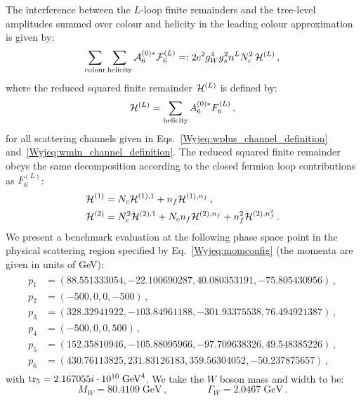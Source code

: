 \documentclass[main.tex]{subfiles}
\begin{document}
The interference between the $L$-loop finite remainders and the tree-level amplitudes summed over colour and helicity in the leading colour approximation is given by:
\begin{equation}
\sum_{\mathrm{colour}}\sum_{\mathrm{helicity}} \mathcal{A}_6^{(0)*} \mathcal{F}_6^{(L)} =: 2 e^2 g_W^4 g_s^2 n^L N_c^2 \, \mathcal{H}^{(L)} \,,
\end{equation}
where the reduced squared finite remainder $\mathcal{H}^{(L)}$ is defined by:
\begin{equation}
\mathcal{H}^{(L)} = \sum_{\mathrm{helicity}}  A_{6}^{(0)*}  F_{6}^{(L)} \,,
\end{equation}
for all scattering channels given in Eqs.~\ref{Wyjeq:wplus_channel_definition} and~\ref{Wyjeq:wmin_channel_definition}. 
The reduced squared finite remainder obeys the same decomposition according to the closed fermion loop contributions as $F_{6}^{(L)}$:
\begin{align} \label{Wyjeq:NfDecompositionH} 
\begin{aligned}
& \mathcal{H}^{(1)} = N_c \mathcal{H}^{(1),1} + n_f \mathcal{H}^{(1),n_f} \,, \\
& \mathcal{H}^{(2)} = N_c^2 \mathcal{H}^{(2),1} + N_c n_f \mathcal{H}^{(2),n_f} + n_f^2 \mathcal{H}^{(2),n_f^2} \,.
\end{aligned}
\end{align}
We present a benchmark evaluation at the following phase space point in the physical scattering region specified by Eq.~\ref{Wyjeq:momconfig} (the momenta are given in units of GeV):
\begin{align}
\label{Wyjeq:PSpoint}
\begin{aligned}
p_1 & = (88.551333054, -22.100690287, 40.080353191, -75.805430956) \,, \\
p_2 & = (-500,0,0,-500) \,,  \\
p_3 & = (328.32941922, -103.84961188, -301.93375538, 76.494921387) \,, \\
p_4 & = (-500,0,0, 500) \,,  \\
p_5 & = (152.35810946, -105.88095966, -97.709638326, 49.548385226)  \,, \\
p_6 & = (430.76113825, 231.83126183, 359.56304052, -50.237875657)   \,, 
\end{aligned}
\end{align}
with $\operatorname{\rm tr}_5 =  2.167055i \cdot 10^{10} \; \mathrm{GeV}^4$. We take the $W$ boson mass and width to be: 
\begin{equation}
M_W = 80.4109 \; \mathrm{GeV} \,, \qquad \qquad \Gamma_W = 2.0467 \; \mathrm{GeV}\,.
\label{Wyjeq:inputparameters}
\end{equation}
\end{document}
